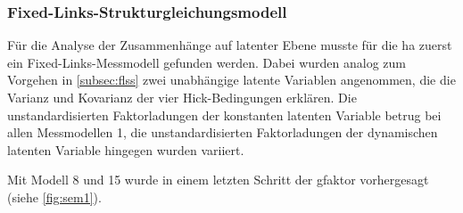 \documentclass[11pt, twoside, a4paper]{book}		%
\begin{document}
\subsubsection*{Fixed-Links-Strukturgleichungsmodell}

Für die Analyse der Zusammenhänge auf latenter Ebene musste für die \gls{ha} zuerst ein Fixed-Links-Messmodell gefunden werden. Dabei wurden analog zum Vorgehen in \autoref{subsec:flss} zwei unabhängige latente Variablen angenommen, die die Varianz und Kovarianz der vier Hick-Bedingungen erklären. Die unstandardisierten Faktorladungen der konstanten latenten Variable betrug bei allen Messmodellen 1, die unstandardisierten Faktorladungen der dynamischen latenten Variable hingegen wurden variiert.



\clearpage

Mit Modell 8 und 15 wurde in einem letzten Schritt der \gls{gfaktor} vorhergesagt (siehe \autoref{fig:sem1}).
\end{document}

